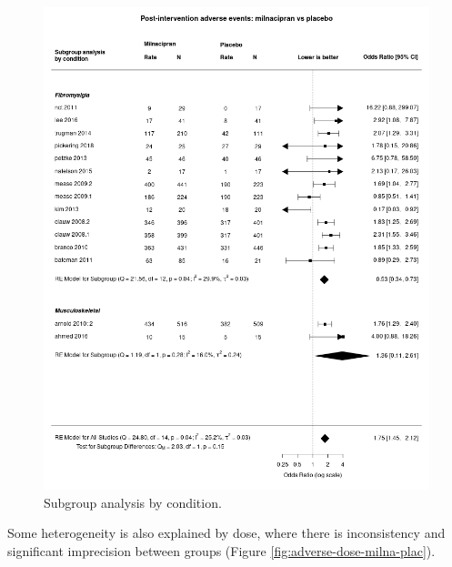 \documentclass{report}\usepackage[]{graphicx}\usepackage[]{color}
\begin{document}
\begin{figure}

\includegraphics[width=\textwidth]{img/adverse-condition-milnacipran-placebo-forest.png}
\caption[Adverse by condition: milnacipran]{
Subgroup analysis by condition. 
}
\label{fig:adverse-condition-milna-plac}
\end{figure}

Some heterogeneity is also explained by dose, where there is inconsistency and significant imprecision between groups (Figure \ref{fig:adverse-dose-milna-plac}).
\end{document}
